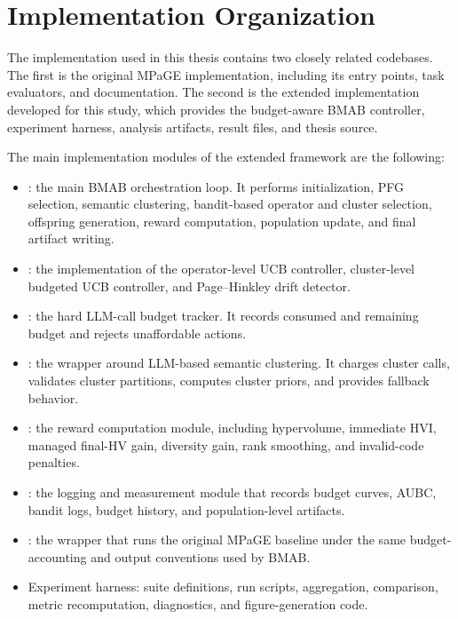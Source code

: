 \documentclass[../main.tex]{subfiles}
\begin{document}
\section{Implementation Organization}

The implementation used in this thesis contains two closely related codebases. The first is the original MPaGE implementation, including its entry points, task evaluators, and documentation. The second is the extended implementation developed for this study, which provides the budget-aware BMAB controller, experiment harness, analysis artifacts, result files, and thesis source.

The main implementation modules of the extended framework are the following:

\begin{itemize}
  \item {}: the main BMAB orchestration loop. It performs initialization, PFG selection, semantic clustering, bandit-based operator and cluster selection, offspring generation, reward computation, population update, and final artifact writing.
  \item {}: the implementation of the operator-level UCB controller, cluster-level budgeted UCB controller, and Page--Hinkley drift detector.
  \item {}: the hard LLM-call budget tracker. It records consumed and remaining budget and rejects unaffordable actions.
  \item {}: the wrapper around LLM-based semantic clustering. It charges cluster calls, validates cluster partitions, computes cluster priors, and provides fallback behavior.
  \item {}: the reward computation module, including hypervolume, immediate HVI, managed final-HV gain, diversity gain, rank smoothing, and invalid-code penalties.
  \item {}: the logging and measurement module that records budget curves, AUBC, bandit logs, budget history, and population-level artifacts.
  \item {}: the wrapper that runs the original MPaGE baseline under the same budget-accounting and output conventions used by BMAB.
  \item Experiment harness: suite definitions, run scripts, aggregation, comparison, metric recomputation, diagnostics, and figure-generation code.
\end{itemize}
\end{document}
